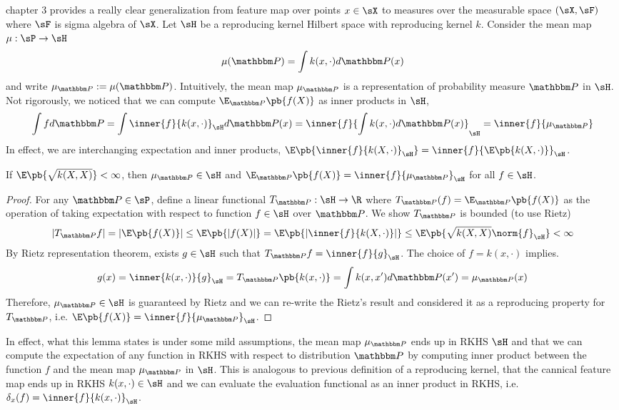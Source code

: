 \documentclass[11pt]{article}
\begin{document}
\cite{muandetKernelMeanEmbedding2017} chapter 3 provides a really clear generalization from feature map over points $x\in\sX$ to measures over the measurable space $(\sX,\sF)$ where $\sF$ is sigma algebra of $\sX$. Let $\sH$ be a reproducing kernel Hilbert space with reproducing kernel $k$. Consider the mean map $\mu:\sP\to\sH$
\begin{align}
    \mu(\bbP)
        = \int k(x,\cdot) d\bbP(x)
\end{align}
and write $\mu_{\bbP} := \mu(\bbP)$. Intuitively, the mean map $\mu_{\bbP}$ is a representation of probability measure $\bbP$ in $\sH$. Not rigorously, we noticed that we can compute $\E_{\bbP}\pb{f(X)}$ as inner products in $\sH$,
\[
    \int f d\bbP
        = \int \inner{f}{k(x,\cdot)}_{\sH} d\bbP(x)
        = \inner{f}{\int k(x,\cdot)d\bbP(x)}_{\sH}
        = \inner{f}{\mu_{\bbP}}
\]
In effect, we are interchanging expectation and inner products, $\E\pb{\inner{f}{k(X,\cdot)}_{\sH}} = \inner{f}{\E\pb{k(X,\cdot)}}_{\sH}$.
\begin{lemma}
    \label{lemma:mean_embedding_reproducing_property}
    If $\E\pb{\sqrt{k(X,X)}} < \infty$, then $\mu_{\bbP} \in \sH$ and $\E_{\bbP}\pb{f(X)} = \inner{f}{\mu_{\bbP}}_{\sH}$ for all $f\in\sH$.
\end{lemma}
\begin{proof}
    For any $\bbP\in\sP$, define a linear functional $T_{\bbP}:\sH\to\R$ where $T_{\bbP}(f) = \E_{\bbP}\pb{f(X)}$ as the operation of taking expectation with respect to function $f\in\sH$ over $\bbP$. We show $T_{\bbP}$ is bounded (to use Rietz)
    \begin{align}
        |T_{\bbP}f|
            = |\E\pb{f(X)}|
            \leq \E\pb{|f(X)|}
            = \E\pb{ \left|  \inner{f}{k(X,\cdot)} \right| }
            \leq \E\pb{ \sqrt{k(X,X)} \norm{f}_{\sH} }
            < \infty
    \end{align}
    By Rietz representation theorem, exists $g\in\sH$ such that $T_{\bbP} f = \inner{f}{g}_{\sH}$. The choice of $f = k(x,\cdot)$ implies.
    \[
        g(x)
            = \inner{k(x,\cdot)}{g}_{\sH} 
            = T_{\bbP}\pb{k(x,\cdot)}
            = \int k(x,x') d\bbP(x')
            = \mu_{\bbP}(x)
    \]
    Therefore, $\mu_{\bbP}\in\sH$ is guaranteed by Rietz and we can re-write the Rietz's result and considered it as a reproducing property for $T_{\bbP}$, i.e. $\E\pb{f(X)} = \inner{f}{\mu_{\bbP}}_{\sH}$.
\end{proof}
In effect, what this lemma states is under some mild assumptions, the mean map $\mu_{\bbP}$ ends up in RKHS $\sH$ and that we can compute the expectation of any function in RKHS with respect to distribution $\bbP$ by computing inner product between the function $f$ and the mean map $\mu_{\bbP}$ in $\sH$. This is analogous to previous definition of a reproducing kernel, that the cannical feature map ends up in RKHS $k(x,\cdot) \in \sH$ and we can evaluate the evaluation functional as an inner product in RKHS, i.e. $\delta_x(f) = \inner{f}{k(x,\cdot)}_{\sH}$. 
\end{document}
